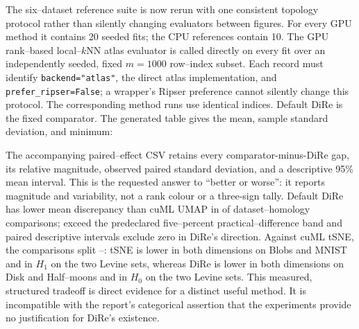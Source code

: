 \documentclass[11pt]{article}
\begin{document}
The six--dataset reference suite is now rerun with one consistent topology
protocol rather than silently changing evaluators between figures. For every
GPU method it contains 20 seeded fits; the CPU references contain 10. The
GPU rank--based local--$k$NN atlas evaluator is called directly on every fit
over an independently seeded, fixed $m=1000$ row--index subset. Each record
must identify \texttt{backend="atlas"}, the direct atlas implementation, and
\texttt{prefer\_ripser=False}; a wrapper's Ripser preference cannot silently
change this protocol. The corresponding method runs use identical indices.
Default DiRe is the fixed comparator. The generated table gives the mean,
sample standard deviation, and minimum:

\begin{center}
\resizebox{\textwidth}{!}{%
  }
\end{center}

The accompanying paired--effect CSV retains every comparator-minus-DiRe gap,
its relative magnitude, observed paired standard deviation, and a descriptive
95\% mean interval. This is the requested answer to ``better or worse'': it
reports magnitude and variability, not a rank colour or a three-sign tally.
Default DiRe has lower mean discrepancy than cuML UMAP in
\SmallAtlasDireLowerVsUmapCount{} of
\SmallAtlasUmapComparisonCount{} dataset--homology comparisons;
\SmallAtlasDireFivePctLowerVsUmapCount{} exceed the predeclared five--percent
practical--difference band and
\SmallAtlasDireIntervalLowerVsUmapCount{} paired descriptive intervals exclude
zero in DiRe's direction. Against cuML tSNE, the
\SmallAtlasTsneComparisonCount{} comparisons split
\SmallAtlasDireLowerVsTsneCount{}--\SmallAtlasTsneLowerVsDireCount{}:
tSNE is lower in both dimensions on Blobs and MNIST and in $H_1$ on the two
Levine sets, whereas DiRe is lower in both dimensions on Disk and Half--moons
and in $H_0$ on the two Levine sets. This measured, structured tradeoff is
direct evidence for a distinct useful method. It is incompatible with the
report's categorical assertion that the experiments provide no justification
for DiRe's existence.
\end{document}
